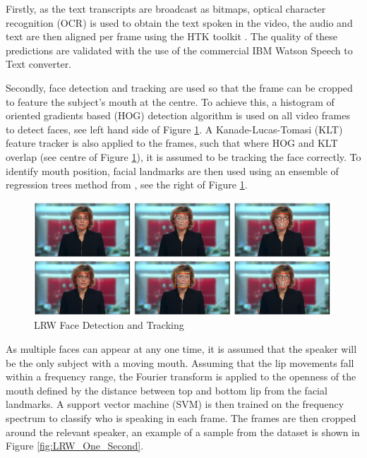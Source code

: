 Firstly, as the text transcripts are broadcast as bitmaps, optical character recognition (OCR) \cite{Buehler2009} is used to obtain the text spoken in the video, the audio and text are then aligned per frame using the HTK toolkit \cite{Woodland1995}.
The quality of these predictions are validated with the use of the commercial IBM Watson Speech to Text converter.

Secondly, face detection and tracking are used so that the frame can be cropped to feature the subject's mouth at the centre.
To achieve this, a histogram of oriented gradients based (HOG) detection algorithm \cite{King2009} is used on all video frames to detect faces, see left hand side of Figure \ref{fig:LRW_Face_Detection}.
A Kanade-Lucas-Tomasi (KLT) feature tracker is also applied to the frames, such that where HOG and KLT overlap (see centre of Figure \ref{fig:LRW_Face_Detection}), it is assumed to be tracking the face correctly.
To identify mouth position, facial landmarks are then used using an ensemble of regression trees method from \cite{Kazemi2014}, see the right of Figure \ref{fig:LRW_Face_Detection}.

\begin{figure}[h]
    \centering
        \includegraphics[width=0.99\textwidth]{figures/lit_review/lrw_face_detection.png}
    \caption{LRW Face Detection and Tracking \cite{Chung2016}}\label{fig:LRW_Face_Detection}
\end{figure}

As multiple faces can appear at any one time, it is assumed that the speaker will be the only subject with a moving mouth.
Assuming that the lip movements fall within a frequency range, the Fourier transform is applied to the openness of the mouth defined by the distance between top and bottom lip from the facial landmarks.
A support vector machine (SVM) is then trained on the frequency spectrum to classify who is speaking in each frame.
The frames are then cropped around the relevant speaker, an example of a sample from the dataset is shown in Figure \ref{fig:LRW_One_Second}.

